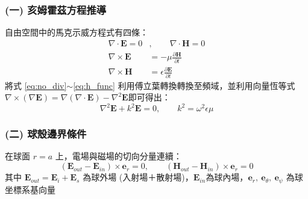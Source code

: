 \subsubsection*{(一) 亥姆霍茲方程推導}
自由空間中的馬克示威方程式有四條：
\begin{align}
    \nabla \cdot \mathbf{E} = 0 &, \qquad \nabla \cdot \mathbf{H} = 0 \label{eq:no_div}\\
    \nabla \times \mathbf{E} &= -\mu \frac{\partial \mathbf{H}}{\partial t} \\
    \nabla \times \mathbf{H} &= \epsilon \frac{\partial \mathbf{E}}{\partial t} \label{eq:h_func}
\end{align}
將式 \eqref{eq:no_div}$\sim$\eqref{eq:h_func}  利用傅立葉轉換轉換至頻域，並利用向量恆等式 \(\nabla \times \left( \nabla \mathbf{E} \right) = \nabla \left( \nabla \cdot \mathbf{E} \right) - \nabla^2 \mathbf{E}\)即可得出：
\begin{equation}
\nabla^2\mathbf{E} + k^2 \mathbf{E} = 0, \qquad k^2 = \omega^2 \epsilon \mu \label{eq:hem}
\end{equation}

\subsubsection*{(二) 球殼邊界條件}
在球面 $r=a$ 上，電場與磁場的切向分量連續：
\begin{equation}
    \left(\mathbf{E}_{out} - \mathbf{E}_{in}\right) \times \mathbf{e}_r = 0, \qquad \left(\mathbf{H}_{out} - \mathbf{H}_{in}\right) \times \mathbf{e}_r = 0
\end{equation}
其中 \(\mathbf{E}_{out} = \mathbf{E}_{i} + \mathbf{E}_{s}\) 為球外場 (入射場＋散射場)，\(\mathbf{E}_{in}\)為球內場，\(\mathbf{e}_r,\ \mathbf{e}_{\theta},\ \mathbf{e}_{\psi}\) 為球坐標系基向量


